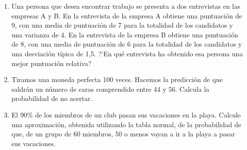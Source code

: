 \begin{adjustwidth}{20pt}{10pt}
\begin{enumerate}[PB. 1. ]
		\item 	Una persona que desea encontrar trabajo se presenta a dos entrevistas en las empresas A y B. En la entrevista de la empresa A obtiene una puntuación de 9, con una media de puntuación de 7 para la totalidad de los candidatos y una varianza de 4. En la entrevista de la empresa B obtiene una puntuación de 8, con una media de puntuación de 6 para la totalidad de los candidatos y una desviación típica de 1,5. ?`En qué entrevista ha obtenido esa persona una mejor puntuación relativa?
		
		\hspace{-1cm}
		
		\hspace{-1cm}  
		
		\hspace{-1cm} 
		
		\hspace{-1cm} 
		\vspace{1cm}
		
		
		
		\item 	Tiramos una moneda perfecta 100 veces. Hacemos la predicción de que saldrán un número de caras comprendido entre 44 y 56. Calcula la probabilidad de no acertar.
		
		\hspace{-1cm}\vspace{1cm}
		
		\item 	El 90\% de los miembros de un club pasan sus vacaciones en la playa. Calcule una aproximación, obtenida utilizando la tabla normal, de la probabilidad de que, de un grupo de 60 miembros, 50 o menos vayan a ir a la playa a pasar sus vacaciones.
		

\end{enumerate}
\end{adjustwidth}

